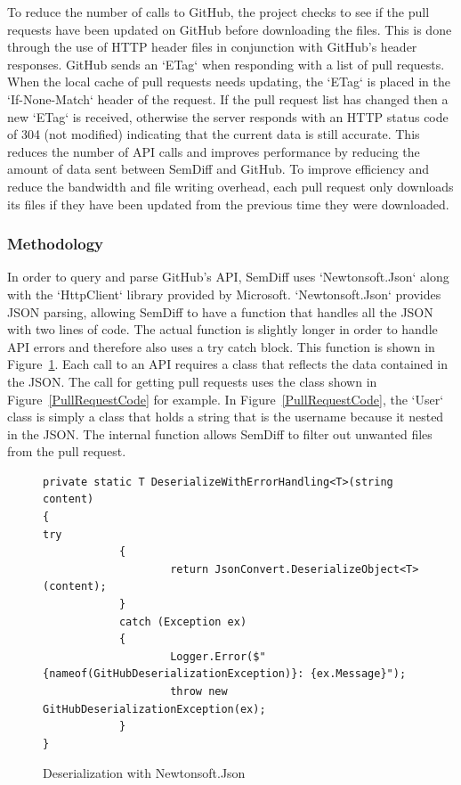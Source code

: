 \documentclass[draftclsnofoot,onecolumn]{IEEEtran}
\begin{document}
To reduce the number of calls to GitHub, the project checks to see if the 
pull requests have been updated on GitHub before downloading the files. This 
is done through the use of HTTP header files in conjunction with GitHub’s 
header responses. GitHub sends an `ETag` when responding with a list of pull 
requests. When the local cache of pull requests needs updating, the `ETag` 
is placed in the `If-None-Match` header of the request. If the pull request 
list has changed then a new `ETag` is received, otherwise the server 
responds with an HTTP status code of 304 (not modified) indicating that the 
current data is still accurate. This reduces the number of API calls and 
improves performance by reducing the amount of data sent between SemDiff and 
GitHub. To improve efficiency and reduce the bandwidth and file writing 
overhead, each pull request only downloads its files if they have been 
updated from the previous time they were downloaded.

\subsubsection{Methodology}

In order to query and parse GitHub’s API, SemDiff uses `Newtonsoft.Json` 
along with the `HttpClient` library provided by Microsoft. `Newtonsoft.Json` 
provides JSON parsing, allowing SemDiff to have a function that handles all 
the JSON with two lines of code. The actual function is slightly longer in 
order to handle API errors and therefore also uses a try catch block. This 
function is shown in Figure~\ref{deserializeNewtonsoft}. Each call to an API 
requires a class that reflects the data contained in the JSON. The call for 
getting pull requests uses the class shown in Figure~\ref{PullRequestCode} 
for example. In Figure~\ref{PullRequestCode}, the `User` class is simply a 
class that holds a string that is the username because it nested in the 
JSON. The internal function allows SemDiff to filter out unwanted files from 
the pull request.

\begin{figure}[!t]
\centering
\begin{lstlisting}
private static T DeserializeWithErrorHandling<T>(string content)
{
try
        	{
            		return JsonConvert.DeserializeObject<T>(content);
        	}
        	catch (Exception ex)
        	{
            		Logger.Error($"{nameof(GitHubDeserializationException)}: {ex.Message}");
            		throw new GitHubDeserializationException(ex);
        	}
}
\end{lstlisting}
\caption{Deserialization with Newtonsoft.Json}
\label{deserializeNewtonsoft}
\end{figure}
\end{document}
